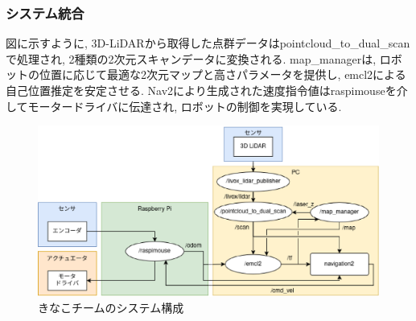 \subsubsection{システム統合}
図に示すように, 3D-LiDARから取得した点群データはpointcloud\_to\_dual\_scanで処理され, 2種類の2次元スキャンデータに変換される. 
map\_managerは, ロボットの位置に応じて最適な2次元マップと高さパラメータを提供し, emcl2による自己位置推定を安定させる. 
Nav2により生成された速度指令値はraspimouseを介してモータードライバに伝達され, ロボットの制御を実現している. 

\begin{figure}[h]
  \begin{center}
    \includegraphics[width=1.0\linewidth]{figs/kinako_system.eps}
    \caption{きなこチームのシステム構成}
    \label{fig:mugimaru_system}
  \end{center}
\end{figure}
